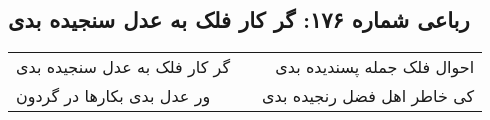 \begin{center}
\section*{رباعی شماره ۱۷۶: گر کار فلک به عدل سنجیده بدی}
\label{sec:sh176}
\begin{longtable}{l p{0.5cm} r}
گر کار فلک به عدل سنجیده بدی
&&
احوال فلک جمله پسندیده بدی
\\
ور عدل بدی بکارها در گردون
&&
کی خاطر اهل فضل رنجیده بدی
\\
\end{longtable}
\end{center}
